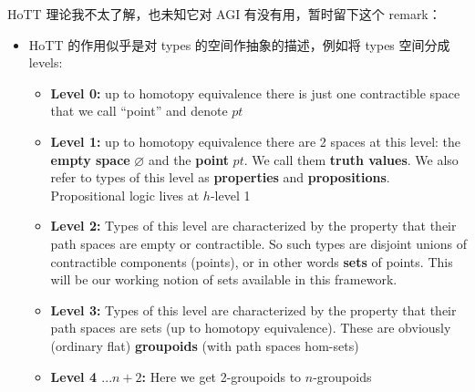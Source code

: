\documentclass[16pt]{beamer}
\begin{document}
\begin{frame}[plain]
HoTT 理论我不太了解，也未知它对 AGI 有没有用，暂时留下这个 remark：
\begin{itemize}
	\item HoTT 的作用似乎是对 types 的空间作抽象的描述，例如将 types 空间分成 levels:
	\begin{itemize}
		\item \textbf{Level 0:} up to homotopy equivalence there is just one contractible space that we call ``point'' and denote $pt$
		
		\item \textbf{Level 1:} up to homotopy equivalence there are 2 spaces at this level:  the \textbf{empty space} $\varnothing$ and the \textbf{point} $pt$.  We call them \textbf{truth values}.  We also refer to types of this level as \textbf{properties} and \textbf{propositions}.  Propositional logic lives at $h$-level 1
		
		\item \textbf{Level 2:}  Types of this level are characterized by the property that their path spaces are empty or contractible.  So such types are disjoint unions of contractible components (points), or in other words \textbf{sets} of points.  This will be our working notion of sets available in this framework.
		
		\item \textbf{Level 3:}  Types of this level are characterized by the property that their path spaces are sets (up to homotopy equivalence).  These are obviously (ordinary flat) \textbf{groupoids} (with path spaces hom-sets)
		
		\item \textbf{Level 4 $... n+2$:}  Here we get 2-groupoids to $n$-groupoids
	\end{itemize}
\end{itemize}
\end{frame}
\end{document}
